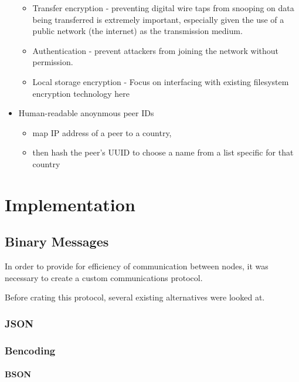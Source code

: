 \documentclass[12pt,a4paper,]{adreport}
\begin{document}
\begin{itemize}
  \begin{itemize}
  \itemsep1pt\parskip0pt
  \item
    Transfer encryption - preventing digital wire taps from snooping on
    data being transferred is extremely important, especially given the
    use of a public network (the internet) as the transmission medium.
  \item
    Authentication - prevent attackers from joining the network without
    permission.
  \item
    Local storage encryption - Focus on interfacing with existing
    filesystem encryption technology here
  \end{itemize}
\item
  Human-readable anoynmous peer IDs

  \begin{itemize}
  \itemsep1pt\parskip0pt
  \item
    map IP address of a peer to a country,
  \item
    then hash the peer's UUID to choose a name from a list specific for
    that country
  \end{itemize}
\end{itemize}

\chapter{Implementation}\label{implementation}

\section{Binary Messages}\label{binary-messages}

In order to provide for efficiency of communication between nodes, it
was necessary to create a custom communications protocol.

Before crating this protocol, several existing alternatives were looked
at.

\subsection{JSON}\label{json}

\subsection{Bencoding}\label{bencoding}

\subsubsection{BSON}\label{bson}
\end{document}
